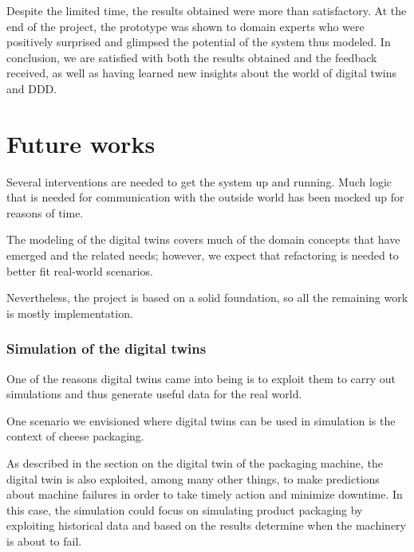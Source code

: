 Despite the limited time, the results obtained were more than satisfactory. At the end of the project, the prototype was shown to domain experts who were positively surprised and glimpsed the potential of the system thus modeled. In conclusion, we are satisfied with both the results obtained and the feedback received, as well as having learned new insights about the world of digital twins and DDD.

\section{Future works}
Several interventions are needed to get the system up and running. Much logic that is needed for communication with the outside world has been mocked up for reasons of time.

The modeling of the digital twins covers much of the domain concepts that have emerged and the related needs; however, we expect that refactoring is needed to better fit real-world scenarios.

Nevertheless, the project is based on a solid foundation, so all the remaining work is mostly implementation.

\subsubsection{Simulation of the digital twins}
One of the reasons digital twins came into being is to exploit them to carry out simulations and thus generate useful data for the real world.

One scenario we envisioned where digital twins can be used in simulation is the context of cheese packaging.

As described in the section on the digital twin of the packaging machine, the digital twin is also exploited, among many other things, to make predictions about machine failures in order to take timely action and minimize downtime. In this case, the simulation could focus on simulating product packaging by exploiting historical data and based on the results determine when the machinery is about to fail.
